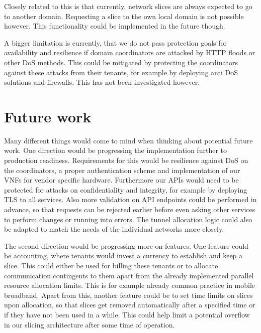 Closely related to this is that currently, network slices are always expected to go to another domain. Requesting a slice to the own local domain is not possible however. This functionality could be implemented in the future though.

A bigger limitation is currently, that we do not pass protection goals for availability and resilience if domain coordinators are attacked by HTTP floods or other DoS methods. This could be mitigated by protecting the coordinators against these attacks from their tenants, for example by deploying anti DoS solutions and firewalls. This has not been investigated however.

\section{Future work}
Many different things would come to mind when thinking about potential future work. One direction would be progressing the implementation further to production readiness. Requirements for this would be resilience against DoS on the coordinators, a proper authentication scheme and implementation of our VNFs for vendor specific hardware. Furthermore our APIs would need to be protected for attacks on confidentiality and integrity, for example by deploying TLS to all services. Also more validation on API endpoints could be performed in advance, so that requests can be rejected earlier before even asking other services to perform changes or running into errors. The tunnel allocation logic could also be adapted to match the needs of the individual networks more closely.

The second direction would be progressing more on features. One feature could be accounting, where tenants would invest a currency to establish and keep a slice. This could either be used for billing these tenants or to allocate communication contingents to them apart from the already implemented parallel resource allocation limits. This is for example already common practice in mobile broadband. Apart from this, another feature could be to set time limits on slices upon allocation, so that slices get removed automatically after a specified time or if they have not been used in a while. This could help limit a potential overflow in our slicing architecture after some time of operation.